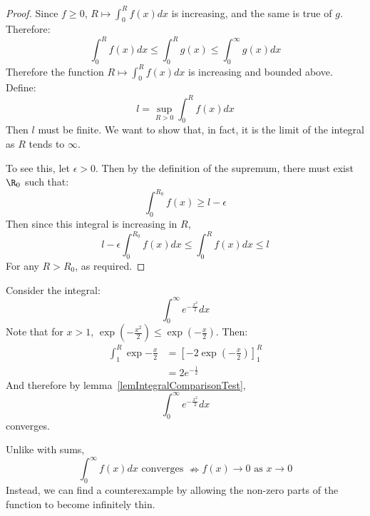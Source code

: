 \documentclass[../Main.tex]{subfiles}
\begin{document}
\begin{proof}
    Since $f \geq 0$, $R \mapsto \int_0^R f(x) dx$ is increasing, and the same is true of $g$. Therefore:
    \begin{equation*}
        \int_0^R f(x) dx \leq \int_0^R g(x) \leq \int_0^\infty g(x) dx
    \end{equation*}
    Therefore the function $R \mapsto \int_0^R f(x) dx$ is increasing and bounded above. Define:
    \begin{equation*}
        l = \sup_{R > 0} \int_0^R f(x) dx
    \end{equation*}
    Then $l$ must be finite. We want to show that, in fact, it is the limit of the integral as $R$ tends to $\infty$.

    To see this, let $\epsilon > 0$. Then by the definition of the supremum, there must exist $\R_0$ such that:
    \begin{equation*}
        \int_0^{R_0} f(x) \geq l - \epsilon
    \end{equation*}
    Then since this integral is increasing in $R$, 
    \begin{equation*}
        l - \epsilon \int_0^{R_0} f(x) dx \leq \int_0^R f(x) dx \leq l
    \end{equation*}
    For any $R > R_0$, as required.
\end{proof}
\begin{example}
    Consider the integral:
    \begin{equation*}
        \int_0^{\infty} e^{-\frac{x^2}{2}} dx
    \end{equation*}
    Note that for $x > 1$, $\exp\left(-\frac{x^2}{2}\right) \leq \exp\left(-\frac{x}{2}\right)$.
    Then:
    \begin{align*}
        \int_1^R \exp{-\frac{x}{2}} &= \left[-2 \exp\left(-\frac{x}{2}\right)\right]_1^R \\
        &= 2e^{-\frac{1}{2}}
    \end{align*}
    And therefore by lemma~\ref{lemIntegralComparisonTest},
    \begin{equation*}
        \int_0^{\infty} e^{-\frac{x^2}{2}} dx
    \end{equation*}
    converges.
\end{example}
\begin{warning}
    Unlike with sums,
    \begin{equation*}
        \int_0^\infty f(x) dx \text{ converges } \nRightarrow f(x) \to 0 \text{ as } x \to 0
    \end{equation*}
    Instead, we can find a counterexample by allowing the non-zero parts of the function to become infinitely thin.
\end{warning}
\end{document}
